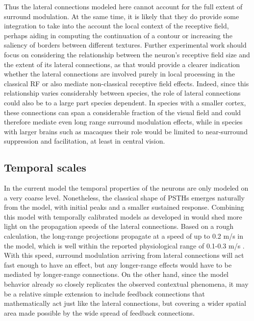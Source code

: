 Thus the lateral connections modeled here cannot account for the
full extent of surround modulation. At the same time, it is likely that
they do provide some integration to take into the account the local
context of the receptive field, perhaps aiding in computing the
continuation of a contour or increasing the saliency of borders
between different textures. Further experimental work should focus on
considering the relationship between the neuron's receptive field size
and the extent of its lateral connections, as that would provide a
clearer indication whether the lateral connections are involved purely
in local processing in the classical RF or also mediate non-classical
receptive field effects. Indeed, since this relationship varies
considerably between species, the role of lateral connections could
also be to a large part species dependent. In species with a smaller
cortex, these connections can span a considerable fraction of the
visual field and could therefore mediate even long range surround
modulation effects, while in species with larger brains such as
macaques their role would be limited to near-surround suppression and
facilitation, at least in central vision.

\subsection{Temporal scales}

In the current model the temporal properties of the neurons are only
modeled on a very coarse level. Nonetheless, the classical shape of
PSTHs emerges naturally from the model, with initial peaks and a
smaller sustained response. Combining this model with temporally
calibrated models as developed in \cite{Stevens2016} would shed more
light on the propagation speeds of the lateral connections.  Based on
a rough calculation, the long-range projections propagate at a speed
of up to 0.2 m/s in the model, which is well within the reported
physiological range of 0.1-0.3 m/s \citep{Bair2003}. With this speed,
surround modulation arriving from lateral connections will act fast
enough to have an effect, but any longer-range effects would have to
be mediated by longer-range connections.  On the other hand, since the
model behavior already so closely replicates the observed contextual
phenomena, it may be a relative simple extension to include feedback
connections that mathematically act just like the lateral connections,
but covering a wider spatial area made possible by the wide spread of
feedback connections.

